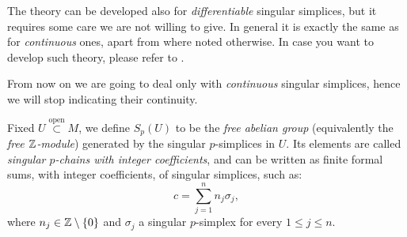 \begin{rem}
	The theory can be developed also for \textit{differentiable} singular simplices, but it requires some care we are not willing to give.
	In general it is exactly the same as for \textit{continuous} ones, apart from where noted otherwise.
	In case you want to develop such theory, please refer to \cite{warner}.

	From now on we are going to deal only with \textit{continuous} singular simplices, hence we will stop indicating their continuity.
\end{rem}

\begin{defn}
Fixed $U \stackrel{\text{open}}{\subset} M$, we define $S_p(U)$ to be the \textit{free abelian group} (equivalently the \textit{free $\mathbb{Z}$-module}) generated by the singular $p$-simplices in $U$.
	Its elements are called \textit{singular $p$-chains with integer coefficients}, and can be written as finite formal sums, with integer coefficients, of singular simplices, such as:
	\begin{equation}
	c = \sum_{j=1}^{n} n_j \sigma_j
	,\end{equation} 
	where $n_j \in \mathbb{Z}\setminus \left\{ 0 \right\}$ and $\sigma_j$ a singular $p$-simplex for every $1 \leq j \leq n$.
\end{defn}


